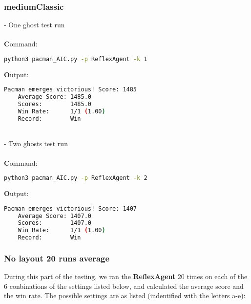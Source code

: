 \documentclass{article}
\begin{document}
\subsubsection{mediumClassic}
\label{sec:mediumClassic}

- One ghost test run \\
~\\
\textbf Command:

\begin{lstlisting}[language=bash, frame=tlbr, framesep=6pt, backgroundcolor=\color{light-gray}]
    python3 pacman_AIC.py -p ReflexAgent -k 1
\end{lstlisting}

\noindent\textbf Output:

\begin{lstlisting}[language=bash, frame=tlbr, framesep=6pt, backgroundcolor=\color{light-gray}]
    Pacman emerges victorious! Score: 1485
    Average Score: 1485.0
    Scores:        1485.0
    Win Rate:      1/1 (1.00)
    Record:        Win
\end{lstlisting}

~\\
- Two ghosts test run \\
~\\
\textbf Command:

\begin{lstlisting}[language=bash, frame=tlbr, framesep=6pt, backgroundcolor=\color{light-gray}]
    python3 pacman_AIC.py -p ReflexAgent -k 2
\end{lstlisting}

\noindent\textbf Output:

\begin{lstlisting}[language=bash, frame=tlbr, framesep=6pt, backgroundcolor=\color{light-gray}]
    Pacman emerges victorious! Score: 1407
    Average Score: 1407.0
    Scores:        1407.0
    Win Rate:      1/1 (1.00)
    Record:        Win
\end{lstlisting}

\subsubsection{No layout 20 runs average}
\label{sec:20runs}

During this part of the testing, we ran the \textbf{ReflexAgent} 20 times on each of the 6 conbinations of the settings listed below, and calculated the average score and the win rate. The possible settings are as listed (indentified with the letters a-e):
\end{document}
